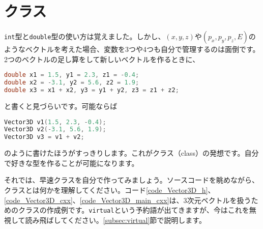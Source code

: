 \clearpage

\section{クラス}
\texttt{int}型と\texttt{double}型の使い方は覚えました。しかし、$(x, y, z)$や$(p_x, p_y, p_z, E)$のようなベクトルを考えた場合、変数を3つや4つも自分で管理するのは面倒です。2つのベクトルの足し算をして新しいベクトルを作るときに、
\begin{lstlisting}[language=c++]
double x1 = 1.5, y1 = 2.3, z1 = -0.4;
double x2 = -3.1, y2 = 5.6, z2 = 1.9;
double x3 = x1 + x2, y3 = y1 + y2, z3 = z1 + z2;
\end{lstlisting}
と書くと見づらいです。可能ならば
\begin{lstlisting}[language=c++]
Vector3D v1(1.5, 2.3, -0.4);
Vector3D v2(-3.1, 5.6, 1.9);
Vector3D v3 = v1 + v2;
\end{lstlisting}
のように書けたほうがすっきりします。これがクラス（class）の発想です。自分で好きな型を作ることが可能になります。

それでは、早速クラスを自分で作ってみましょう。ソースコードを眺めながら、クラスとは何かを理解してください。コード\ref{code_Vector3D_h}、\ref{code_Vector3D_cxx}、\ref{code_Vector3D_main_cxx}は、3次元ベクトルを扱うためのクラスの作成例です。\texttt{virtual}という予約語が出てきますが、今はこれを無視して読み飛ばしてください。\ref{subsec:virtual}節で説明します。

\begin{NoFloat}

\end{NoFloat}
\begin{NoFloat}

\end{NoFloat}
\begin{NoFloat}

\end{NoFloat}

